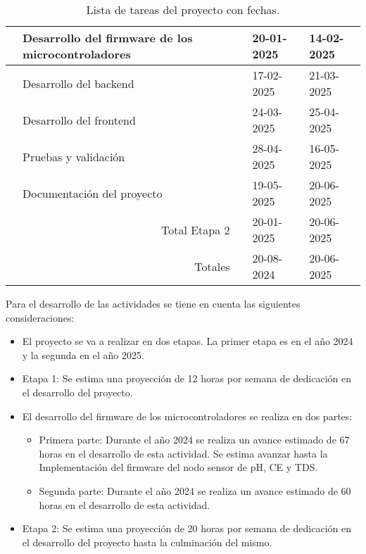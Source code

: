 \begin{table}[ht]
\begin{tabularx}{\linewidth}{|p{0.8cm}|p{8.33cm}|p{1cm}|p{1.8cm}|p{1.8cm}|}
		\centering{4}                       & Desarrollo del firmware de los microcontroladores & \raggedleft{60} & 20-01-2025 & 14-02-2025 \\ \hline
		\centering{5}                       & Desarrollo del backend                            & \raggedleft{90} & 17-02-2025 & 21-03-2025 \\ \hline
		\centering{6}                       & Desarrollo del frontend                           & \raggedleft{93} & 24-03-2025 & 25-04-2025 \\ \hline
		\centering{7}                       & Pruebas y validación                              & \raggedleft{48} & 28-04-2025 & 16-05-2025 \\ \hline
		\centering{8}                       & Documentación del proyecto                        & \raggedleft{97} & 19-05-2025 & 20-06-2025 \\ \hline
		\multicolumn{2}{|r|}{Total Etapa 2} & \raggedleft{388}                                  & 20-01-2025      & 20-06-2025              \\ \hline
		\multicolumn{2}{|r|}{Totales}       & \raggedleft{615}                                  & 20-08-2024      & 20-06-2025              \\ \hline
	\end{tabularx}
	\caption{Lista de tareas del proyecto con fechas.}
	\label{tab:tabGantt}
\end{table}

Para el desarrollo de las actividades se tiene en cuenta las siguientes
consideraciones:

\begin{itemize}
	\item El proyecto se va a realizar en dos etapas. La primer etapa es en el año 2024 y la segunda en el año 2025.
	\item Etapa 1: Se estima una proyección de 12 horas por semana de dedicación en el
	      desarrollo del proyecto.
	\item El desarrollo del firmware de los microcontroladores se realiza en dos partes:
	      \begin{itemize}
		      \item Primera parte: Durante el año 2024 se realiza un avance estimado de 67 horas en
		            el desarrollo de esta actividad. Se estima avanzar hasta la Implementación del
		            firmware del nodo sensor de pH, CE y TDS.
		      \item Segunda parte: Durante el año 2024 se realiza un avance estimado de 60 horas en
		            el desarrollo de esta actividad.
	      \end{itemize}
	\item Etapa 2: Se estima una proyección de 20 horas por semana de dedicación en el
	      desarrollo del proyecto hasta la culminación del mismo.
\end{itemize}

